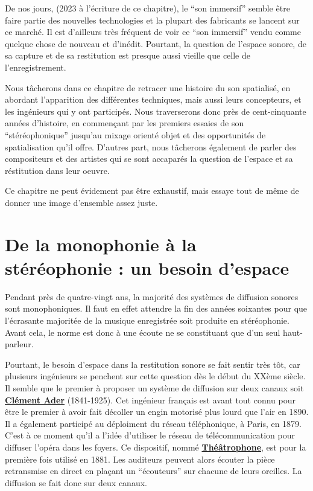 \documentclass[
  letterpaper,
  DIV=11,
  numbers=noendperiod]{scrreprt}
\begin{document}
De nos jours, (2023 à l'écriture de ce chapitre), le ``son immersif''
semble être faire partie des nouvelles technologies et la plupart des
fabricants se lancent sur ce marché. Il est d'ailleurs très fréquent de
voir ce ``son immersif'' vendu comme quelque chose de nouveau et
d'inédit. Pourtant, la question de l'espace sonore, de sa capture et de
sa restitution est presque aussi vieille que celle de l'enregistrement.

Nous tâcherons dans ce chapitre de retracer une histoire du son
spatialisé, en abordant l'apparition des différentes techniques, mais
aussi leurs concepteurs, et les ingénieurs qui y ont participés. Nous
traverserons donc près de cent-cinquante années d'histoire, en
commençant par les premiers essaies de son ``stéréophonique'' jusqu'au
mixage orienté objet et des opportunités de spatialisation qu'il offre.
D'autres part, nous tâcherons également de parler des compositeurs et
des artistes qui se sont accaparés la question de l'espace et sa
réstitution dans leur oeuvre.

Ce chapitre ne peut évidement pas être exhaustif, mais essaye tout de
même de donner une image d'ensemble assez juste.

\hypertarget{de-la-monophonie-uxe0-la-stuxe9ruxe9ophonie-un-besoin-despace}{%
\section{De la monophonie à la stéréophonie : un besoin
d'espace}\label{de-la-monophonie-uxe0-la-stuxe9ruxe9ophonie-un-besoin-despace}}

Pendant près de quatre-vingt ans, la majorité des systèmes de diffusion
sonores sont monophoniques. Il faut en effet attendre la fin des années
soixantes pour que l'écrasante majoritée de la musique enregistrée soit
produite en stéréophonie. Avant cela, le norme est donc à une écoute ne
se constituant que d'un seul haut-parleur.

Pourtant, le besoin d'espace dans la restitution sonore se fait sentir
très tôt, car plusieurs ingénieurs se penchent sur cette question dès le
début du XXème siècle. Il semble que le premier à proposer un système de
diffusion sur deux canaux soit
\textbf{\href{https://fr.wikipedia.org/wiki/Clément_Ader}{Clément Ader}}
(1841-1925). Cet ingénieur français est avant tout connu pour être le
premier à avoir fait décoller un engin motorisé plus lourd que l'air en
1890. Il a également participé au déploiment du réseau téléphonique, à
Paris, en 1879. C'est à ce moment qu'il a l'idée d'utiliser le réseau de
télécommunication pour diffuser l'opéra dans les foyers. Ce dispositif,
nommé
\textbf{\href{https://fr.wikipedia.org/wiki/Théâtrophone}{Théâtrophone}},
est pour la première fois utilisé en 1881. Les auditeurs peuvent alors
écouter la pièce retransmise en direct en plaçant un ``écouteurs'' sur
chacune de leurs oreilles. La diffusion se fait donc sur deux canaux.
\end{document}

